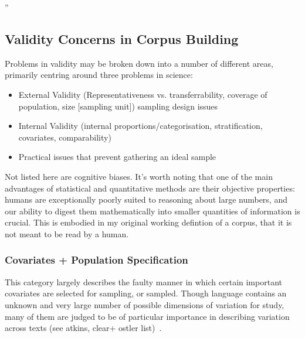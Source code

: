 ''













\subsection{Validity Concerns in Corpus Building}



Problems in validity may be broken down into a number of different areas, primarily centring around three problems in science:

\begin{itemize}
    \item External Validity (Representativeness vs. transferrability, coverage of population, size [sampling unit]) sampling design issues
    \item Internal Validity (internal proportions/categorisation, stratification, covariates, comparability)
    \item Practical issues that prevent gathering an ideal sample
\end{itemize}




Not listed here are cognitive biases. It's worth noting that one of the main advantages of statistical and quantitative methods are their objective properties: humans are exceptionally poorly suited to reasoning about large numbers, and our ability to digest them mathematically into smaller quantities of information is crucial. This is embodied in my original working defintion of a corpus, that it is not meant to be read by a human.  


\subsubsection{Covariates + Population Specification}
This category largely describes the faulty manner in which certain important covariates are selected for sampling, or sampled. Though language contains an unknown and very large number of possible dimensions of variation for study, many of them are judged to be of particular importance in describing variation across texts (see atkins, clear+ ostler list)~\cite{atkins1992corpus}.

